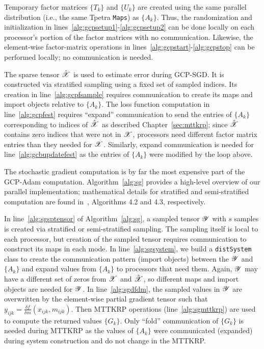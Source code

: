 Temporary factor matrices $\{ T_k \}$ and $\{ U_k \}$ are created using the 
same parallel distribution (i.e., the same Tpetra {\tt Maps}) 
as $\{ A_k \}$.  Thus, the randomization and initialization in 
lines~\ref{alg:gcpsetup1}-\ref{alg:gcpsetup2} can be done locally on each
processor's portion of the factor matrices with
no communication.
Likewise, the element-wise factor-matrix operations in 
lines~\ref{alg:gcpstart}-\ref{alg:gcpstop}
can be performed locally; no communication is
needed.

The sparse tensor $\hat \X$ is used to estimate error during GCP-SGD.
It is constructed via stratified sampling using a fixed set of sampled 
indices.
Its creation in line~\ref{alg:gcpfsample} requires communication
to create its maps and import objects relative to $\{ A_k \}$.
The loss function computation in 
line~\ref{alg:gcpfest} requires ``expand'' communication to send the entries of
$\{ A_k \}$ corresponding to indices of $\hat \X$ 
as described Chapter~\ref{sec:mttkrp}; since $\hat \X$ contains zero indices
that were not in $\X$, processors need different factor matrix entries
than they needed for $\X$.  Similarly, expand communication is needed for 
line~\ref{alg:gcbupdatefest} as the entries of $\{ A_k \}$ were modified
by the loop above.

The stochastic gradient computation is by far the most expensive part of 
the GCP-Adam computation.  Algorithm~\ref{alg:sg} provides a high-level
overview of our parallel implementation; mathematical details for stratified
and semi-stratified computation are found in~\cite{KH19}, Algorithms 
4.2 and 4.3, respectively.

In line~\ref{alg:sgsptensor} of Algorithm~\ref{alg:sg}, 
a sampled tensor $\Y$ with $s$ samples is created via stratified or
semi-stratified sampling. The sampling itself is local to each processor, 
but creation of the sampled tensor requires communication to construct its 
maps in each mode.
In line~\ref{alg:sgsystem}, we 
build a {\tt distSystem} class to create the communication
pattern (import objects) between the $\Y$ and $\{ A_k \}$ and expand
values from $\{ A_k \}$ to processors that need them.
Again, $\Y$ may have a different set of zeros from $\X$ and $\hat \X$, so 
different maps and import objects are needed for $\Y$.
In line~\ref{alg:sgdfdm}, the sampled values in $\Y$ are overwritten by
the element-wise partial gradient tensor
such that
$y_{ijk} = \frac{\delta f}{\delta m}(x_{ijk}, m_{ijk})$.
Then MTTKRP operations (line~\ref{alg:sgmttkrp}) 
are used to compute the returned values $\{ G_k \}$.
Only ``fold'' communication of $\{  G_k \}$
is needed during MTTKRP as the values of $\{ A_k \}$
were communicated (expanded) 
during system construction and do not change in the MTTKRP.

